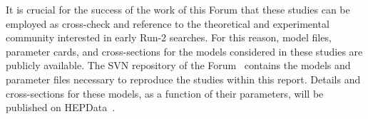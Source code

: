 It is crucial for the success of the work of this Forum that these studies can be employed as cross-check
and reference to the theoretical and experimental community interested in early Run-2 searches. 
For this reason, model files, parameter cards, and cross-sections for the models considered in these studies 
are publicly available. The SVN repository of the Forum~\cite{ForumSVN} contains the models and parameter files
necessary to reproduce the studies within this report. Details and cross-sections for these models, 
as a function of their parameters, will be published on HEPData~\cite{HEPData}. 

